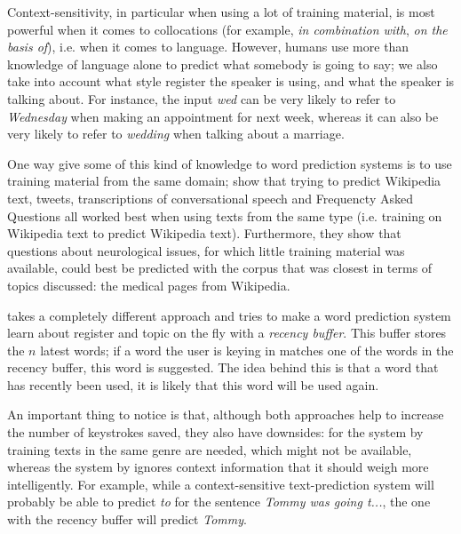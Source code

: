 \documentclass[12pt]{article}
\begin{document}

Context-sensitivity, in particular when using a lot of training material, is most powerful when it comes to collocations (for example, \emph{in combination with}, \emph{on the basis of}), i.e. when it comes to language. However, humans use more than knowledge of language alone to predict what somebody is going to say; we also take into account what style register the speaker is using, and what the speaker is talking about. For instance, the input \emph{wed} can be very likely to refer to \emph{Wednesday} when making an appointment for next week, whereas it can also be very likely to refer to \emph{wedding} when talking about a marriage. 

One way give some of this kind of knowledge to word prediction systems is to use training material from the same domain;  show that trying to predict Wikipedia text, tweets, transcriptions of conversational speech and Frequencty Asked Questions all worked best when using texts from the same type (i.e. training on Wikipedia text to predict Wikipedia text). Furthermore, they show that questions about neurological issues, for which little training material was available, could best be predicted with the corpus that was closest in terms of topics discussed: the medical pages from Wikipedia. 

 takes a completely different approach and tries to make a word prediction system learn about register and topic on the fly with a \emph{recency buffer}. This buffer stores the $n$ latest words; if a word the user is keying in matches one of the words in the recency buffer, this word is suggested. The idea behind this is that a word that has recently been used, it is likely that this word will be used again.

An important thing to notice is that, although both approaches help to increase the number of keystrokes saved, they also have downsides: for the system by  training texts in the same genre are needed, which might not be available, whereas the system by  ignores context information that it should weigh more intelligently. For example, while a context-sensitive text-prediction system will probably be able to predict \emph{to} for the sentence \emph{Tommy was going t...}, the one with the recency buffer will predict \emph{Tommy}.
\end{document}
